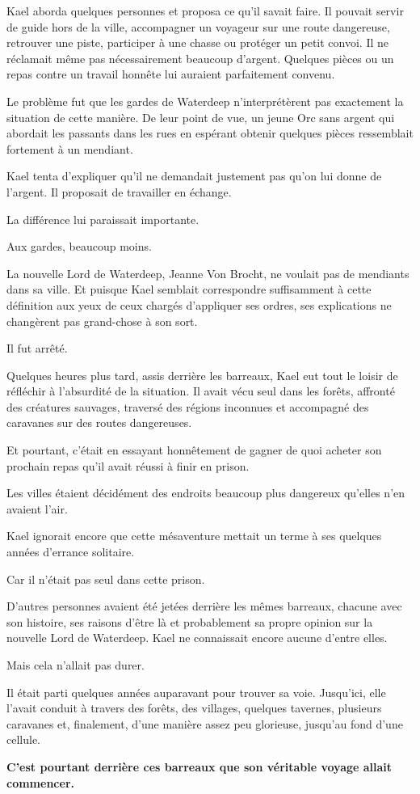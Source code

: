 Kael aborda quelques personnes et proposa ce qu'il savait faire. Il pouvait
servir de guide hors de la ville, accompagner un voyageur sur une route
dangereuse, retrouver une piste, participer à une chasse ou protéger un petit
convoi. Il ne réclamait même pas nécessairement beaucoup d'argent. Quelques
pièces ou un repas contre un travail honnête lui auraient parfaitement
convenu.

Le problème fut que les gardes de Waterdeep n'interprétèrent pas exactement la
situation de cette manière. De leur point de vue, un jeune Orc sans argent qui
abordait les passants dans les rues en espérant obtenir quelques pièces
ressemblait fortement à un mendiant.

Kael tenta d'expliquer qu'il ne demandait justement pas qu'on lui donne de
l'argent. Il proposait de travailler en échange.

La différence lui paraissait importante.

Aux gardes, beaucoup moins.

La nouvelle Lord de Waterdeep, Jeanne Von Brocht, ne voulait pas de mendiants
dans sa ville. Et puisque Kael semblait correspondre suffisamment à cette
définition aux yeux de ceux chargés d'appliquer ses ordres, ses explications ne
changèrent pas grand-chose à son sort.

Il fut arrêté.

\scenebreak

Quelques heures plus tard, assis derrière les barreaux, Kael eut tout le loisir
de réfléchir à l'absurdité de la situation. Il avait vécu seul dans les forêts,
affronté des créatures sauvages, traversé des régions inconnues et accompagné
des caravanes sur des routes dangereuses.

Et pourtant, c'était en essayant honnêtement de gagner de quoi acheter son
prochain repas qu'il avait réussi à finir en prison.

Les villes étaient décidément des endroits beaucoup plus dangereux qu'elles
n'en avaient l'air.

Kael ignorait encore que cette mésaventure mettait un terme à ses quelques
années d'errance solitaire.

Car il n'était pas seul dans cette prison.

D'autres personnes avaient été jetées derrière les mêmes barreaux, chacune avec
son histoire, ses raisons d'être là et probablement sa propre opinion sur la
nouvelle Lord de Waterdeep. Kael ne connaissait encore aucune d'entre elles.

Mais cela n'allait pas durer.

Il était parti quelques années auparavant pour trouver sa voie. Jusqu'ici, elle
l'avait conduit à travers des forêts, des villages, quelques tavernes,
plusieurs caravanes et, finalement, d'une manière assez peu glorieuse, jusqu'au
fond d'une cellule.

\begin{center}
\textbf{C'est pourtant derrière ces barreaux que son véritable voyage allait
commencer.}
\end{center}